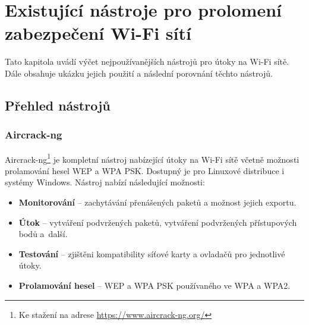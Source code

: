 \chapter{Existující nástroje pro prolomení zabezpečení Wi-Fi sítí}
\label{nastroje}
Tato kapitola uvádí výčet nejpoužívanějších nástrojů pro útoky na Wi-Fi sítě. Dále obsahuje ukázku jejich použití a následní porovnání těchto nástrojů.

\section{Přehled nástrojů}
\subsection{Aircrack-ng}
\label{aircrack}
Aircrack-ng\footnote{Ke stažení na adrese \url{https://www.aircrack-ng.org/}} je kompletní nástroj nabízející útoky na Wi-Fi sítě včetně možnosti prolamování hesel WEP a WPA PSK. Dostupný je pro Linuxové distribuce i systémy Windows. Nástroj nabízí následující možnosti:
\begin{itemize}
  \item{\textbf{Monitorování} -- zachytávání přenášených paketů a možnost jejich exportu.}
  \item{\textbf{Útok} -- vytváření podvržených paketů, vytváření podvržených přístupových bodů a~další.}
  \item{\textbf{Testování} -- zjištěni kompatibility síťové karty a ovladačů pro jednotlivé útoky.}
  \item{\textbf{Prolamování hesel} -- WEP a WPA PSK používaného ve WPA a WPA2.}
\end{itemize}

